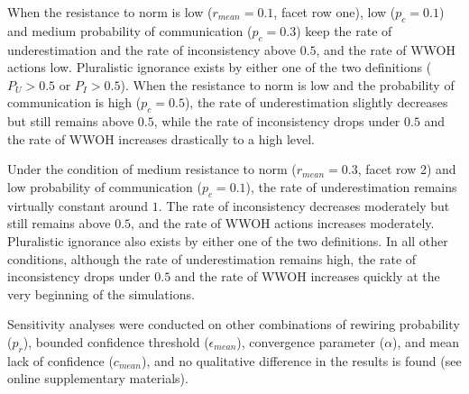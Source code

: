 \documentclass[
  11pt,
]{article}
\begin{document}
When the resistance to norm is low (\(r_{mean} = 0.1\), facet row one),
low (\(p_c = 0.1\)) and medium probability of communication
(\(p_c = 0.3\)) keep the rate of underestimation and the rate of
inconsistency above \(0.5\), and the rate of WWOH actions low.
Pluralistic ignorance exists by either one of the two definitions
(\(P_U > 0.5\) or \(P_I > 0.5\)). When the resistance to norm is low and
the probability of communication is high (\(p_c = 0.5\)), the rate of
underestimation slightly decreases but still remains above \(0.5\),
while the rate of inconsistency drops under \(0.5\) and the rate of WWOH
increases drastically to a high level.

Under the condition of medium resistance to norm (\(r_{mean} = 0.3\),
facet row 2) and low probability of communication (\(p_c = 0.1\)), the
rate of underestimation remains virtually constant around \(1\). The
rate of inconsistency decreases moderately but still remains above
\(0.5\), and the rate of WWOH actions increases moderately. Pluralistic
ignorance also exists by either one of the two definitions. In all other
conditions, although the rate of underestimation remains high, the rate
of inconsistency drops under \(0.5\) and the rate of WWOH increases
quickly at the very beginning of the simulations.

Sensitivity analyses were conducted on other combinations of rewiring
probability (\(p_r\)), bounded confidence threshold
(\(\epsilon_{mean}\)), convergence parameter (\(\alpha\)), and mean lack
of confidence (\(c_{mean}\)), and no qualitative difference in the
results is found (see online supplementary materials).
\end{document}
